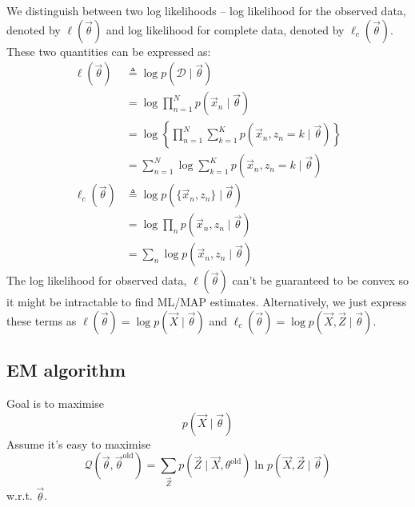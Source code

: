 We distinguish between two log likelihoods -- log likelihood for the observed data, denoted by $\ell(\vec \theta)$ and log likelihood for complete data, denoted by $\ell_c(\vec \theta)$. These two quantities can be expressed as:
\begin{align}
    \ell(\vec \theta)   &\triangleq \log p(\mathcal D \mid \vec \theta) \nonumber\\
                        &= \log \prod_{n = 1}^N p(\vec x_n \mid \vec \theta)\nonumber\\
                        &= \log \left\{\prod_{n = 1}^N \sum_{k = 1}^K p(\vec x_n, z_n = k \mid \vec \theta)\right\} \nonumber\\
                        &= \sum_{n = 1}^N \log \sum_{k = 1}^K p(\vec x_n, z_n = k \mid \vec \theta)\\
    \ell_c(\vec \theta) &\triangleq \log p\left(\{\vec x_n, z_n\} \mid \vec \theta\right) \nonumber\\
                        &= \log \prod_n p(\vec x_n, z_n \mid \vec \theta) \nonumber\\
                        &= \sum_n \log p(\vec x_n, z_n \mid \vec \theta)
\end{align}
The log likelihood for observed data, $\ell(\vec \theta)$ can't be guaranteed to be convex so it might be intractable to find ML/MAP estimates. Alternatively, we just express these terms as $\ell(\vec \theta) = \log p(\vec X \mid \vec \theta)$ and $\ell_c(\vec \theta) = \log p (\vec X, \vec Z \mid \vec \theta)$.

\subsection{EM algorithm}
Goal is to maximise 
$$p(\vec X \mid \vec \theta)$$
Assume it's easy to maximise
\begin{equation}
    \mathcal Q\left(\vec \theta, \vec \theta^{\text{old}}\right) = \sum_{\vec Z} p\left(\vec Z \mid \vec X, \theta^{\text{old}}\right) \ln p\left(\vec X, \vec Z \mid \vec \theta\right)
\end{equation}
w.r.t. $\vec \theta$.

